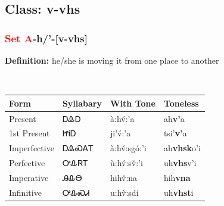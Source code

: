 \subsection*{Class: v-vhs}
\nopagebreak
\needspace{2in}
\subsubsection*{\textcolor{Red}{Set A}{-}\textbf{h/'}{-}[v-vhs]}
\nopagebreak
\textbf{Definition: } he/she is moving it from one place to another
\\[0.5em]
\begin{tabularx}{\textwidth}{l X X X}%
\toprule%
\textbf{Form}&\textbf{Syllabary}&\textbf{With Tone}&\textbf{Toneless}\\%
\midrule%
Present&ᎠᎲᎠ&à:hv́:’a&ah\textbf{v'}a\\%
1st Present&ᏥᎥᎠ&ji’v́:’a&tsi'\textbf{v'}a\\%
Imperfective&ᎠᎲᏍᎪᎢ&à:hv́:sgó:’i&ah\textbf{vhsk}o'i\\%
Perfective&ᎤᎲᏒᎢ&ù:hv́:sv̌:’i&uh\textbf{vhs}v'i\\%
Imperative&ᎯᎲᎾ&hihv̌:na&hih\textbf{vna}\\%
Infinitive&ᎤᎲᏍᏗ&u:hv̀:sdi&uh\textbf{vhst}i\\%
\bottomrule%
\end{tabularx}
\\[1em]